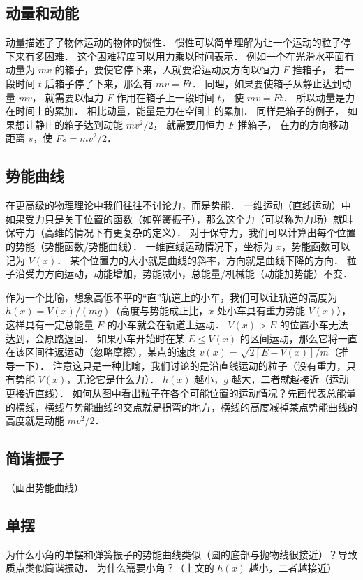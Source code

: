 
\subsection{动量和动能}
动量描述了了物体运动的物体的惯性． 惯性可以简单理解为让一个运动的粒子停下来有多困难． 这个困难程度可以用力乘以时间表示． 例如一个在光滑水平面有动量为 $mv$ 的箱子，要使它停下来，人就要沿运动反方向以恒力 $F$ 推箱子， 若一段时间 $t$ 后箱子停了下来，那么有 $mv = Ft$． 同理，如果要使箱子从静止达到动量 $mv$， 就需要以恒力 $F$ 作用在箱子上一段时间 $t$， 使 $mv = Ft$． 所以动量是力在时间上的累加． 相比动量，能量是力在空间上的累加． 同样是箱子的例子， 如果想让静止的箱子达到动能 $mv^2/2$， 就需要用恒力 $F$ 推箱子， 在力的方向移动距离 $s$，使 $Fs = mv^2/2$．

\subsection{势能曲线}
在更高级的物理理论中我们往往不讨论力，而是势能． 一维运动（直线运动）中如果受力只是关于位置的函数（如弹簧振子），那么这个力（可以称为力场）就叫保守力（高维的情况下有更复杂的定义）． 对于保守力，我们可以计算出每个位置的势能（势能函数/势能曲线）． 一维直线运动情况下，坐标为 $x$，势能函数可以记为 $V(x)$． 某个位置力的大小就是曲线的斜率，方向就是曲线下降的方向． 粒子沿受力方向运动，动能增加，势能减小，总能量/机械能（动能加势能）不变．

作为一个比喻，想象高低不平的“直”轨道上的小车，我们可以让轨道的高度为 $h(x) = V(x)/(mg)$（高度与势能成正比，$x$ 处小车具有重力势能 $V(x)$），这样具有一定总能量 $E$ 的小车就会在轨道上运动． $V(x) > E$ 的位置小车无法达到，会原路返回． 如果小车开始时在某 $E \leq V(x)$ 的区间运动，那么它将一直在该区间往返运动（忽略摩擦），某点的速度 $v(x) = \sqrt{2[E - V(x)]/m}$（推导一下）． 注意这只是一种比喻，我们讨论的是沿直线运动的粒子（没有重力，只有势能 $V(x)$，无论它是什么力）． $h(x)$ 越小，$g$ 越大，二者就越接近（运动更接近直线）． 如何从图中看出粒子在各个可能位置的运动情况？先画代表总能量的横线，横线与势能曲线的交点就是拐弯的地方，横线的高度减掉某点势能曲线的高度就是动能 $mv^2/2$．

\subsection{简谐振子}
（画出势能曲线）

\subsection{单摆}
为什么小角的单摆和弹簧振子的势能曲线类似（圆的底部与抛物线很接近）？导致质点类似简谐振动． 为什么需要小角？（上文的 $h(x)$ 越小，二者越接近）

